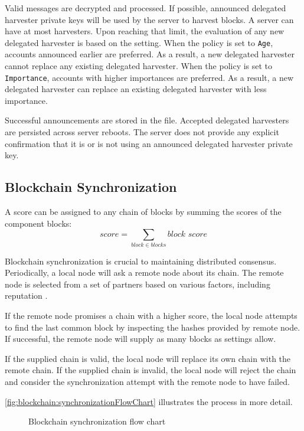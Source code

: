 Valid messages are decrypted and processed.
If possible, announced delegated harvester private keys will be used by the server to harvest blocks.
A server can have at most  harvesters.
Upon reaching that limit, the evaluation of any new delegated harvester is based on the  setting.
When the policy is set to \texttt{Age}, accounts announced earlier are preferred.
As a result, a new delegated harvester cannot replace any existing delegated harvester.
When the policy is set to \texttt{Importance}, accounts with higher importances are preferred.
As a result, a new delegated harvester can replace an existing delegated harvester with less importance.

Successful announcements are stored in the  file.
Accepted delegated harvesters are persisted across server reboots.
The server does not provide any explicit confirmation that it is or is not using an announced delegated harvester private key.

\subsection{Blockchain Synchronization}
\label{sec:blockchain:sync}

A score can be assigned to any chain of blocks by summing the scores of the component blocks:
\begin{equation}
\tag{blockchain score} \mathit{score} = \sum_{\mathit{block} \in \mathit{blocks}} \textit{block score}
\end{equation}

Blockchain synchronization is crucial to maintaining distributed consensus.
Periodically, a local node will ask a remote node about its chain.
The remote node is selected from a set of partners based on various factors, including reputation .

If the remote node promises a chain with a higher score, the local node attempts to find the last common block by inspecting the hashes provided by remote node.
If successful, the remote node will supply as many blocks as settings allow.

If the supplied chain is valid, the local node will replace its own chain with the remote chain.
If the supplied chain is invalid, the local node will reject the chain and consider the synchronization attempt with the remote node to have failed.

\autoref{fig:blockchain:synchronizationFlowChart} illustrates the process in more detail.

\begin{figure}
	\begin{center}
		
		\caption{Blockchain synchronization flow chart\label{fig:blockchain:synchronizationFlowChart}}
	\end{center}
\end{figure}
